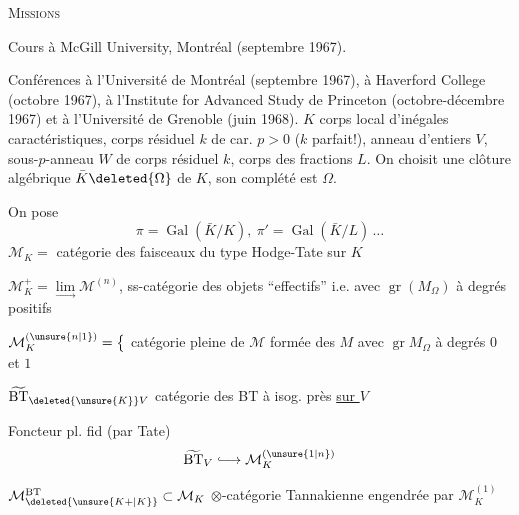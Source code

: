 \begin{center}\textsc{Missions}\end{center}

Cours à McGill University, Montréal (septembre 1967).

Conférences à l’Université de Montréal (septembre 1967), à Haverford College (octobre 1967), à l’Institute for Advanced Study de Princeton (octobre-décembre 1967) et à l’Université de Grenoble (juin 1968).
 $K$ corps local d’inégales caractéristiques, corps résiduel $k$ de car. $p>0$ ($k$ parfait!), anneau d’entiers $V$, sous-$p$-anneau $W$ de corps résiduel $k$, corps des fractions $L$. On choisit une clôture algébrique $\bar K\deleted{\Omega}$ de $K$, son complété est $\Omega$.


On pose
\[
\pi=\operatorname{Gal}(\bar K/K),\ \pi'=\operatorname{Gal}(\bar K/L)\,\ldots
\]
$\mathcal M_K=$ catégorie des faisceaux du type Hodge-Tate sur $K$ 

$\mathcal M_K^+=\underset{\longrightarrow}{\lim}\mathcal M^{(n)}$, ss-catégorie des objets ``effectifs'' i.e. avec  $\operatorname{gr}(M_\Omega)$ à degrés positifs

$\mathcal M_K^{(\unsure{n|1})}=\bigl\{$ catégorie pleine de $\mathcal M$ formée des $M$ avec $\operatorname{gr}M_\Omega$ à degrés $0$ et $1$

$\widetilde{\mathrm{BT}}_{\deleted{\unsure{K}}V}$ catégorie des BT à isog. près \uline{sur $V$}

Foncteur pl. fid (par Tate)
\[
\widetilde{\mathrm{BT}}_V\lhook\joinrel\longrightarrow\mathcal M_K^{(\unsure{1|n})}
\]

$\mathcal M_{\deleted{\unsure{K+|K}}}^{\mathrm{BT}}\subset\mathcal M_K$ $\otimes$-catégorie Tannakienne engendrée par $\mathcal M_K^{(1)}$

